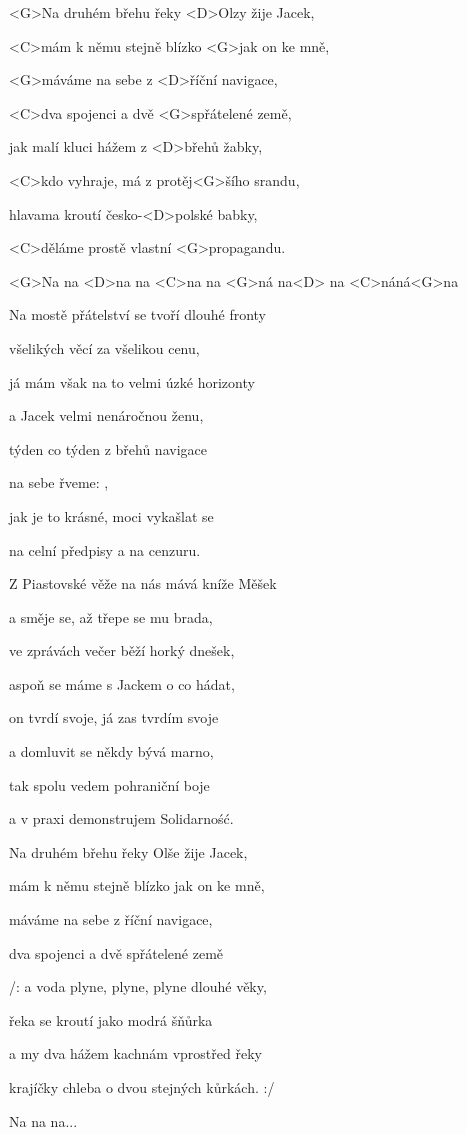 
\zs
<G>Na druhém břehu řeky <D>Olzy žije Jacek, 

<C>mám k němu stejně blízko <G>jak on ke mně, 

<G>máváme na sebe z <D>říční navigace, 

<C>dva spojenci a dvě <G>spřátelené země, 

jak malí kluci hážem z <D>břehů žabky, 

<C>kdo vyhraje, má z protěj<G>šího srandu, 

hlavama kroutí česko-<D>polské babky, 

<C>děláme prostě vlastní <G>propagandu. 

<G>Na na <D>na na <C>na na <G>ná na<D> na <C>náná<G>na 
\ks

\zs
Na mostě přátelství se tvoří dlouhé fronty 

všelikých věcí za všelikou cenu, 

já mám však na to velmi úzké horizonty 

a Jacek velmi nenáročnou ženu, 

týden co týden z břehů navigace 

na sebe řveme: , 

jak je to krásné, moci vykašlat se 

na celní předpisy a na cenzuru.
\ks

\zs
Z Piastovské věže na nás mává kníže Měšek 

a směje se, až třepe se mu brada, 

ve zprávách večer běží horký dnešek, 

aspoň se máme s Jackem o co hádat, 

on tvrdí svoje, já zas tvrdím svoje 

a domluvit se někdy bývá marno, 

tak spolu vedem pohraniční boje 

a v praxi demonstrujem Solidarno\'s\'c.
\ks

\zs
Na druhém břehu řeky Olše žije Jacek, 

mám k němu stejně blízko jak on ke mně, 

máváme na sebe z říční navigace, 

dva spojenci a dvě spřátelené země 

/: a voda plyne, plyne, plyne dlouhé věky, 

řeka se kroutí jako modrá šňůrka 

a my dva hážem kachnám vprostřed řeky 

krajíčky chleba o dvou stejných kůrkách. :/ 

Na na na...
\ks
\kp





